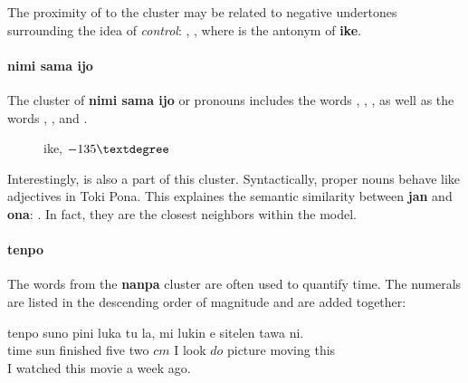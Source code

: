 \documentclass[14pt, a4paper]{extreport}
\makeatletter
\DeclareRobustCommand\ttfamily
        {\not@math@alphabet\ttfamily\mathtt
         \fontfamily\ttdefault\small\selectfont}
\makeatother
\begin{document}
The proximity of  to the cluster may be related to negative undertones surrounding the idea of \textit{control}: , , where  is the antonym of \textbf{ike}.
        \paragraph{nimi sama ijo}
The cluster of \textbf{nimi sama ijo} or pronouns includes the words , , , as well as the words , , and .

\begin{figure}[ht]%
  \def\angle{-135}
  \bigskip
  \centering
  \caption{ike, \(\angle\textdegree\)}
\end{figure}%

Interestingly,  is also a part of this cluster. Syntactically, proper nouns behave like adjectives in Toki Pona. This explaines the semantic similarity between \textbf{jan} and \textbf{ona}: . In fact, they are the closest neighbors within the model.
      \paragraph{tenpo}
The words from the \textbf{nanpa} cluster are often used to quantify time. The numerals are listed in the descending order of magnitude and are added together:

\begin{exe}
  \ex
  \gll tenpo suno pini luka tu la, mi lukin e sitelen tawa ni. \\
       time sun finished five two $cm$ I look $do$ picture moving this \\
  \glt I watched this movie a week ago.
\end{exe}
\end{document}
